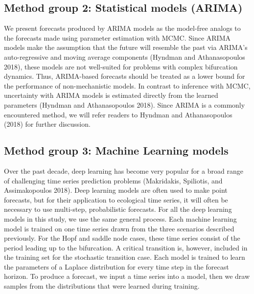 \documentclass{article}
\begin{document}
\hypertarget{method-group-2-statistical-models-arima}{%
\subsection{Method group 2: Statistical models
(ARIMA)}\label{method-group-2-statistical-models-arima}}

We present forecasts produced by ARIMA models as the model-free analogs
to the forecasts made using parameter estimation with MCMC. Since ARIMA
models make the assumption that the future will resemble the past via
ARIMA's auto-regressive and moving average components (Hyndman and
Athanasopoulos 2018), these models are not well-suited for problems with
complex bifurcation dynamics. Thus, ARIMA-based forecasts should be
treated as a lower bound for the performance of non-mechanistic models.
In contrast to inference with MCMC, uncertainty with ARIMA models is
estimated directly from the learned parameters (Hyndman and
Athanasopoulos 2018). Since ARIMA is a commonly encountered method, we
will refer readers to Hyndman and Athanasopoulos (2018) for further
discussion.

\hypertarget{method-group-3-machine-learning-models}{%
\subsection{Method group 3: Machine Learning
models}\label{method-group-3-machine-learning-models}}

Over the past decade, deep learning has become very popular for a broad
range of challenging time series prediction problems (Makridakis,
Spiliotis, and Assimakopoulos 2018). Deep learning models are often used
to make point forecasts, but for their application to ecological time
series, it will often be necessary to use multi-step, probabilistic
forecasts. For all the deep learning models in this study, we use the
same general process. Each machine learning model is trained on one time
series drawn from the three scenarios described previously. For the Hopf
and saddle node cases, these time series consist of the period leading
up to the bifurcation. A critical transition is, however, included in
the training set for the stochastic transition case. Each model is
trained to learn the parameters of a Laplace distribution for every time
step in the forecast horizon. To produce a forecast, we input a time
series into a model, then we draw samples from the distributions that
were learned during training.
\end{document}
